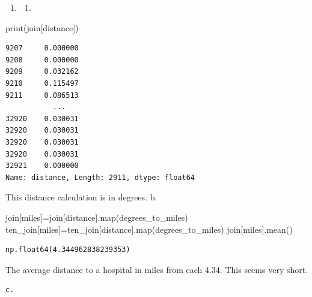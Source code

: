 \documentclass[
  letterpaper,
  DIV=11,
  numbers=noendperiod]{scrartcl}
\newenvironment{Shaded}{\begin{snugshade}}{\end{snugshade}}
\newcommand{\BuiltInTok}[1]{\textcolor[rgb]{0.00,0.23,0.31}{#1}}
\newcommand{\NormalTok}[1]{\textcolor[rgb]{0.00,0.23,0.31}{#1}}
\newcommand{\OperatorTok}[1]{\textcolor[rgb]{0.37,0.37,0.37}{#1}}
\newcommand{\StringTok}[1]{\textcolor[rgb]{0.13,0.47,0.30}{#1}}
\providecommand{\tightlist}{%
  \setlength{\itemsep}{0pt}\setlength{\parskip}{0pt}}\usepackage{longtable,booktabs,array}
\begin{document}
\begin{enumerate}
\def\labelenumi{\arabic{enumi}.}
\setcounter{enumi}{4}
\tightlist
\item
  \begin{enumerate}
  \def\labelenumii{\alph{enumii}.}
  \tightlist
  \item
  \end{enumerate}
\end{enumerate}

\begin{Shaded}
\begin{Highlighting}[]
\BuiltInTok{print}\NormalTok{(join[}\StringTok{\textquotesingle{}distance\textquotesingle{}}\NormalTok{])}
\end{Highlighting}
\end{Shaded}

\begin{verbatim}
9207     0.000000
9208     0.000000
9209     0.032162
9210     0.115497
9211     0.086513
           ...   
32920    0.030031
32920    0.030031
32920    0.030031
32920    0.030031
32921    0.000000
Name: distance, Length: 2911, dtype: float64
\end{verbatim}

This distance calculation is in degrees. b.

\begin{Shaded}
\begin{Highlighting}[]
\NormalTok{join[}\StringTok{\textquotesingle{}miles\textquotesingle{}}\NormalTok{]}\OperatorTok{=}\NormalTok{join[}\StringTok{\textquotesingle{}distance\textquotesingle{}}\NormalTok{].}\BuiltInTok{map}\NormalTok{(degrees\_to\_miles)}
\NormalTok{ten\_join[}\StringTok{\textquotesingle{}miles\textquotesingle{}}\NormalTok{]}\OperatorTok{=}\NormalTok{ten\_join[}\StringTok{\textquotesingle{}distance\textquotesingle{}}\NormalTok{].}\BuiltInTok{map}\NormalTok{(degrees\_to\_miles)}
\NormalTok{join[}\StringTok{\textquotesingle{}miles\textquotesingle{}}\NormalTok{].mean()}
\end{Highlighting}
\end{Shaded}

\begin{verbatim}
np.float64(4.344962838239353)
\end{verbatim}

The average distance to a hospital in miles from each 4.34. This seems
very short.

\begin{verbatim}
c.
\end{verbatim}
\end{document}
